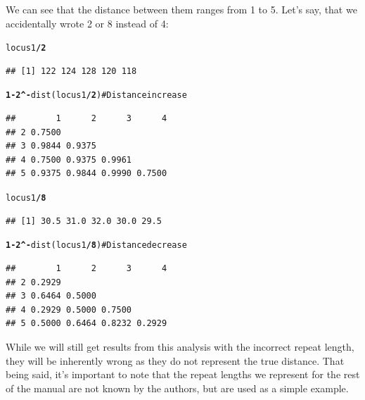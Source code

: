 \documentclass[letterpaper]{article}\usepackage[]{graphicx}\usepackage[]{color}
\makeatletter
\newcommand{\hlnum}[1]{\textcolor[rgb]{0.502,0,0.502}{\textbf{#1}}}%
\newcommand{\hlcom}[1]{\textcolor[rgb]{1,0.502,0}{#1}}%
\newcommand{\hlopt}[1]{\textcolor[rgb]{1,0,0.502}{\textbf{#1}}}%
\newcommand{\hlstd}[1]{\textcolor[rgb]{0,0,0}{#1}}%
\newcommand{\hlkwd}[1]{\textcolor[rgb]{0,0.267,0.4}{#1}}%
\newenvironment{kframe}{%
 \def\at@end@of@kframe{}%
 \ifinner\ifhmode%
  \def\at@end@of@kframe{\end{minipage}}%
  \begin{minipage}{\columnwidth}%
 \fi\fi%
 \def\FrameCommand##1{\hskip\@totalleftmargin \hskip-\fboxsep
 \colorbox{shadecolor}{##1}\hskip-\fboxsep
     \hskip-\linewidth \hskip-\@totalleftmargin \hskip\columnwidth}%
 \MakeFramed {\advance\hsize-\width
   \@totalleftmargin\z@ \linewidth\hsize
   \@setminipage}}%
 {\par\unskip\endMakeFramed%
 \at@end@of@kframe}
\newenvironment{knitrout}{}{} %
\makeatother
\begin{document}
We can see that the distance between them ranges from 1 to 5. Let's say, that we accidentally wrote 2 or 8 instead of 4:
\begin{knitrout}\footnotesize
{}\color{fgcolor}\begin{kframe}
\begin{alltt}
\hlstd{locus1}\hlopt{/}\hlnum{2}
\end{alltt}
\begin{verbatim}
## [1] 122 124 128 120 118
\end{verbatim}
\begin{alltt}
\hlnum{1} \hlopt{-} \hlnum{2}\hlopt{^-}\hlkwd{dist}\hlstd{(locus1}\hlopt{/}\hlnum{2}\hlstd{)}  \hlcom{# Distance increase}
\end{alltt}
\begin{verbatim}
##        1      2      3      4
## 2 0.7500                     
## 3 0.9844 0.9375              
## 4 0.7500 0.9375 0.9961       
## 5 0.9375 0.9844 0.9990 0.7500
\end{verbatim}
\begin{alltt}
\hlstd{locus1}\hlopt{/}\hlnum{8}
\end{alltt}
\begin{verbatim}
## [1] 30.5 31.0 32.0 30.0 29.5
\end{verbatim}
\begin{alltt}
\hlnum{1} \hlopt{-} \hlnum{2}\hlopt{^-}\hlkwd{dist}\hlstd{(locus1}\hlopt{/}\hlnum{8}\hlstd{)}  \hlcom{# Distance decrease}
\end{alltt}
\begin{verbatim}
##        1      2      3      4
## 2 0.2929                     
## 3 0.6464 0.5000              
## 4 0.2929 0.5000 0.7500       
## 5 0.5000 0.6464 0.8232 0.2929
\end{verbatim}
\end{kframe}
\end{knitrout}

While we will still get results from this analysis with the incorrect repeat length, they will be inherently wrong as they do not represent the true distance. That being said, it's important to note that the repeat lengths we represent for the rest of the manual are not known by the authors, but are used as a simple example. 
\end{document}
